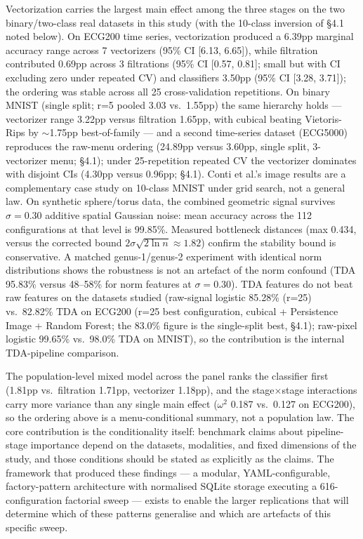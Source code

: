 \documentclass[12pt, a4paper]{report}
\theoremstyle{definition}
\theoremstyle{plain}
\theoremstyle{remark}
\begin{document}
Vectorization carries the largest main effect among the three stages
on the two binary/two-class real datasets in this study (with the
10-class inversion of \S4.1 noted below). On ECG200 time series,
vectorization produced a 6.39pp
marginal accuracy range across 7 vectorizers (95\% CI [6.13, 6.65]),
while filtration contributed 0.69pp across 3 filtrations (95\% CI
[0.57, 0.81]; small but with CI excluding zero under repeated CV) and classifiers
3.50pp (95\% CI [3.28, 3.71]); the ordering was stable across all
25 cross-validation repetitions. On binary MNIST (single split; r{=}5 pooled 3.03 vs.\ 1.55pp) the same
hierarchy holds --- vectorizer range 3.22pp versus filtration 1.65pp, with
cubical beating Vietoris-Rips by $\sim$1.75pp best-of-family --- and
a second time-series dataset (ECG5000) reproduces the raw-menu ordering
(24.89pp versus 3.60pp, single split, 3-vectorizer menu; \S4.1); under
25-repetition repeated CV the vectorizer dominates with disjoint
CIs (4.30pp versus 0.96pp; \S4.1). Conti et al.'s image results are a complementary case study
on 10-class MNIST under grid search, not a general law. On synthetic sphere/torus data, the combined geometric signal
survives $\sigma = 0.30$ additive spatial Gaussian noise: mean
accuracy across the 112 configurations at that level is 99.85\%.
Measured bottleneck distances (max 0.434, versus the corrected bound
$2\sigma\sqrt{2\ln n} \approx 1.82$) confirm the stability bound is
conservative. A matched genus-1/genus-2 experiment with identical
norm distributions shows the robustness is not an artefact of the
norm confound (TDA 95.83\% versus 48--58\% for norm features at
$\sigma=0.30$). TDA features do not beat raw
features on the datasets studied (raw-signal logistic 85.28\% (r{=}25) vs.~82.82\%
TDA on ECG200 (r{=}25 best configuration, cubical + Persistence Image
+ Random Forest; the 83.0\% figure is the single-split best, \S4.1); raw-pixel logistic
99.65\% vs.~98.0\% TDA on MNIST),
so the contribution is the internal TDA-pipeline comparison.

The population-level mixed model across the panel ranks the
classifier first (1.81pp vs.\ filtration 1.71pp, vectorizer 1.18pp),
and the stage$\times$stage interactions carry more variance than any
single main effect ($\omega^2$ 0.187 vs.\ 0.127 on ECG200), so the
ordering above is a menu-conditional summary, not a population law.
The core contribution is the conditionality itself: benchmark claims
about pipeline-stage importance depend on the datasets, modalities,
and fixed dimensions of the study, and those conditions should be
stated as explicitly as the claims. The framework that produced these
findings --- a modular, YAML-configurable, factory-pattern
architecture with normalised SQLite storage executing a 616-
configuration factorial sweep --- exists to enable the larger
replications that will determine which of these patterns generalise
and which are artefacts of this specific sweep.
\end{document}

